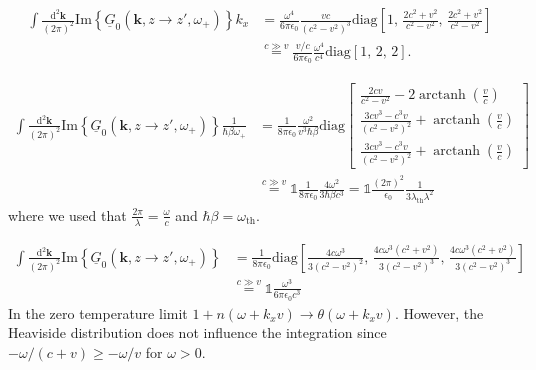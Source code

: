 \documentclass[11pt]{article}
\newcommand{\vv}[1]{\mathbf{#1}}
\newcommand{\dd}[0]{\mathrm{d}}
\DeclareMathOperator\arctanh{arctanh}
\begin{document}
\begin{align}
  \int\frac{\dd^2\vv k}{(2\pi)^2}  \mathrm{Im}\left\{\underline{G}_0(\vv k, z\to z',\omega_+)\right\}k_x 
  &=
\frac{\omega^4}{6\pi\epsilon_0} 
 \frac{ v c }{(c^2-v^2)^3}   
\mathrm{diag}\left[
    1,\,
  \frac{  2 c^2+v^2}{ c^2-v^2}
  ,\,
  \frac{ 2 c^2+v^2}{ c^2-v^2}
\right]
\\
&\stackrel{c\gg v}=
\frac{v/c }{6\pi\epsilon_0} 
 \frac{ \omega^4 }{c^4}   
\mathrm{diag}\left[
    1,\,
    2
    ,\,
     2\right]
.
\end{align}


\begin{align}
  \int\frac{\dd^2\vv k}{(2\pi)^2}  \mathrm{Im}\left\{\underline{G}_0(\vv k, z\to z',\omega_+)\right\}\frac{1}{\hbar\beta\omega_+} 
  &=
  \frac{1}{8\pi\epsilon_0}
  \frac{\omega^2}{v^3\hbar\beta}
  \mathrm{diag}
  \begin{bmatrix}
  \frac{2c v}{c^2-v^2}-2\arctanh\left(\frac{v}{c}\right)
  \\
  \frac{3 c v^3-c^3 v}{\left(c^2-v^2\right)^2}+\arctanh\left(\frac{v}{c}\right)
  \\
  \frac{3 c v^3-c^3 v}{\left(c^2-v^2\right)^2}+\arctanh\left(\frac{v}{c}\right)
  \end{bmatrix}
  \\
  &\stackrel{c\gg v}=
  \mathbb{1}\frac{1}{8\pi\epsilon_0}\frac{4\omega^2}{3\hbar\beta c^3}
  =
  \mathbb{1}\frac{(2\pi)^2}{\epsilon_0}\frac{1}{3\lambda_\mathrm{th}\lambda^2}
\end{align}
where we used that $\frac{2\pi}{\lambda}=\frac{\omega}{c}$ and $\hbar\beta=\omega_\mathrm{th}$.


\begin{align}
  \int\frac{\dd^2\vv k}{(2\pi)^2}  \mathrm{Im}\left\{\underline{G}_0(\vv k, z\to z',\omega_+)\right\} 
  &=
  \frac{1}{8\pi\epsilon_0}\mathrm{diag}\left[
  \frac{4 c \omega ^3}{3 \left(c^2-v^2\right)^2}
    ,\,
    \frac{4 c \omega ^3 \left(c^2+v^2\right)}{3 \left(c^2-v^2\right)^3}
  ,\,
\frac{4 c \omega ^3 \left(c^2+v^2\right)}{3 \left(c^2-v^2\right)^3}  
\right]
  \\
  &\stackrel{c\gg v}=
  \mathbb{1}
\frac{\omega^3}{6\pi \epsilon_0 c^3}
\end{align}
In the zero temperature limit $1+n(\omega+k_xv)\to \theta(\omega+k_xv)$. However, the Heaviside distribution does not influence the integration since $-\omega/(c+v)\geq -\omega/v$ for $\omega>0$.
\end{document}
